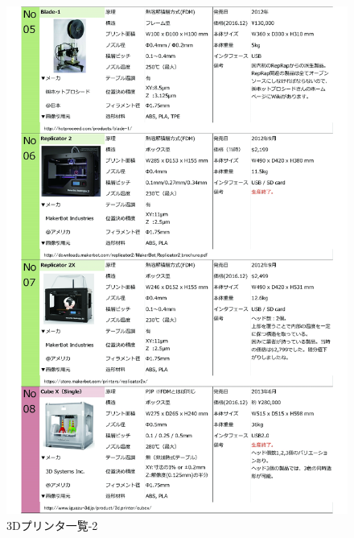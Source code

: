 \begin{figure}[htbp]
\centering
\includegraphics[width=380pt]{fig/fig25_cmyk.jpg}
\caption{3Dプリンタ一覧-2}
\label{fig25}
\end{figure}

